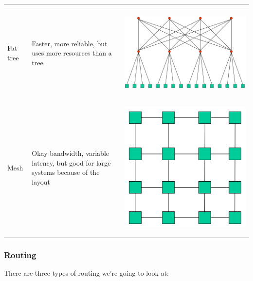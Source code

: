 \begin{center}
\begin{tabular}{| m{2cm} | m{5cm} | c |}
\begin{minipage}{.3\textwidth}
\begin{center}
      \end{center}
    \end{minipage} \\ \hline
    Fat tree & Faster, more reliable, but uses more resources than a tree & 
    \begin{minipage}{.3\textwidth}
      \begin{center}
        \includegraphics[width=0.5\linewidth]{images/fat-tree}
      \end{center}
    \end{minipage} \\ \hline
    Mesh & Okay bandwidth, variable latency, but good for large systems because
    of the layout & 
    \begin{minipage}{.3\textwidth}
      \begin{center}
        \includegraphics[width=0.5\linewidth]{images/mesh}
      \end{center}
    \end{minipage} \\ \hline
  \end{tabular}
\end{center}

\subsubsection{Routing}

There are three types of routing we're going to look at:


